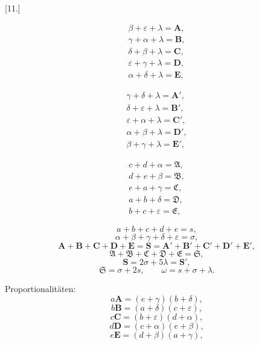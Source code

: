 
\clearpage\begin{center}[11.]\end{center}

\noindent\begin{minipage}[t]{.46\textwidth}
\vspace{0pt}
\[
\begin{gathered}
\beta+\varepsilon+\lambda=\boldsymbol{A}, \\
\gamma+\alpha+\lambda=\boldsymbol{B}, \\
\delta+\beta+\lambda=\boldsymbol{C}, \\
\varepsilon+\gamma+\lambda=\boldsymbol{D}, \\
\alpha+\delta+\lambda=\boldsymbol{E},
\end{gathered}
\]

\[
\begin{gathered}
\gamma+\delta+\lambda=\boldsymbol{A}', \\
\delta+\varepsilon+\lambda=\boldsymbol{B}', \\
\varepsilon+\alpha+\lambda=\boldsymbol{C}', \\
\alpha+\beta+\lambda=\boldsymbol{D}', \\
\beta+\gamma+\lambda=\boldsymbol{E}',
\end{gathered}
\]

\end{minipage}\hfill\begin{minipage}[t]{.50\textwidth}
\vspace{0pt}
\begin{center}\resizebox{5.1cm}{!}{}\end{center}

\[
\begin{gathered}
c+d+\alpha=\mathfrak{A}, \\
d+e+\beta=\mathfrak{B}, \\
e+a+\gamma=\mathfrak{C}, \\
a+b+\delta=\mathfrak{D}, \\
b+c+\varepsilon=\mathfrak{E},
\end{gathered}
\]
\end{minipage}


\[
a+b+c+d+e=s,
\]
\[
\alpha+\beta+\gamma+\delta+\varepsilon=\sigma,
\]
\[
\boldsymbol{A}+\boldsymbol{B}+\boldsymbol{C}+\boldsymbol{D}+\boldsymbol{E}=\boldsymbol{S}=\boldsymbol{A}'+\boldsymbol{B}'+\boldsymbol{C}'+\boldsymbol{D}'+\boldsymbol{E}',
\]
\[
\mathfrak{A}+\mathfrak{B}+\mathfrak{C}+\mathfrak{D}+\mathfrak{E}=\mathfrak{S},
\]
\[
\boldsymbol{S}=2\sigma+5\lambda=\boldsymbol{S}',
\]
\[
\mathfrak{S}=\sigma+2s, \qquad \omega=s+\sigma+\lambda.
\]

Proportionalitäten:
\[
a\boldsymbol{A}=(e+\gamma)(b+\delta),
\]
\[
b\boldsymbol{B}=(a+\delta)(c+\varepsilon),
\]
\[
c\boldsymbol{C}=(b+\varepsilon)(d+\alpha),
\]
\[
d\boldsymbol{D}=(c+\alpha)(e+\beta),
\]
\[
e\boldsymbol{E}=(d+\beta)(a+\gamma),
\]
